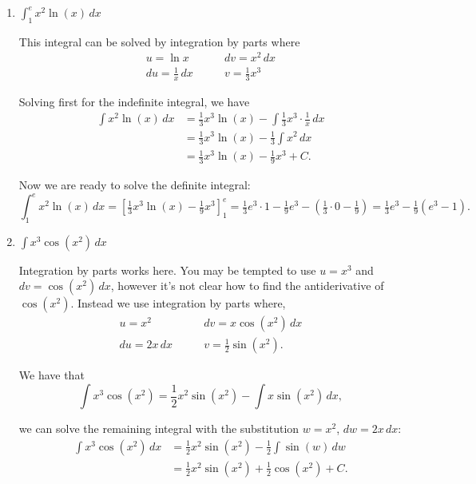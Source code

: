 \documentclass{article}
\begin{document}
\begin{enumerate}
\begin{enumerate}

\item
\begin{problem}[\vfill]
    $\displaystyle \int_1^e x^2 \ln(x) \, dx$
\end{problem}

\begin{solution}
    This integral can be solved by integration by parts where
    \begin{align*} 
    u = \ln x \qquad &dv = x^2 \, dx \\
    du = \frac{1}{x} \, dx \qquad &v = \frac{1}{3}x^3
    \end{align*}

Solving first for the indefinite integral, we have
\begin{align*}
    \int x^2 \ln(x)\, dx &= 
    \frac{1}{3}x^3 \ln(x) - \int \frac{1}{3}x^3 \cdot \frac{1}{x}\, dx \\
    &= \frac{1}{3}x^3 \ln(x) - \frac{1}{3} \int x^2\, dx \\
    &= \frac{1}{3}x^3 \ln(x) - \frac{1}{9}x^3 + C.
\end{align*}

Now we are ready to solve the definite integral:
\[\int_1^e x^2 \ln(x)\, dx = 
\left[\tfrac{1}{3}x^3 \ln(x) - \tfrac{1}{9}x^3\right]_1^e
= \tfrac{1}{3}e^3 \cdot 1 - \tfrac{1}{9}e^3 -(\tfrac{1}{3}\cdot 0-\tfrac{1}{9}) = \tfrac{1}{3}e^3 - \tfrac{1}{9} (e^3 - 1).\]
\end{solution}

\item
\begin{problem}[\vfill]
    $\displaystyle \int x^3 \cos(x^2) \, dx$
\end{problem}

\begin{solution}
    Integration by parts works here. You may be tempted to
    use $u = x^3$ and $dv = \cos(x^2)\, dx$, however it's not
    clear how to find the antiderivative of $\cos(x^2)$. Instead
    we use integration by parts where,
    \begin{align*}
        u = x^2 \qquad & dv = x\cos(x^2) \, dx \\
        du = 2x \, dx \qquad & v = \frac{1}{2}\sin(x^2).
    \end{align*}

    We have that
    \[\int x^3\cos(x^2) = \frac{1}{2}x^2\sin(x^2) -
    \int x\sin(x^2) \, dx,\]

    we can solve the remaining integral with the substitution
    $w = x^2$, $dw = 2x\,dx$:
    \begin{align*}
    \int x^3 \cos(x^2)\, dx &= \frac{1}{2}x^2 \sin(x^2) - \frac{1}{2} \int \sin(w)\,dw \\
    &= \frac{1}{2}x^2 \sin(x^2) + \frac{1}{2} \cos(x^2) + C.
    \end{align*}
\end{solution}


\end{enumerate}
\end{enumerate}
\end{document}
